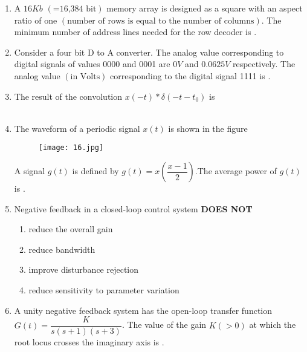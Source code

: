 \documentclass[12pt,-letter paper]{article}
\providecommand{\brak}[1]{\ensuremath{\left(#1\right)}}
\theoremstyle{remark}
\begin{document}
\begin{enumerate}
\item A $16Kb$ \brak{\text{=16,384 bit}} memory array is designed as a square with an aspect ratio of one \brak{\text{number of rows is equal to the number of columns}}. The minimum number of address lines needed for the row decoder is \underline{\hspace{1cm}}.
\item Consider a four bit D to A converter. The analog value corresponding to digital signals of values 0000 and 0001 are $0V$ and 0.$0625V$ respectively. The analog value \brak{\text{in Volts}} corresponding to the digital signal 1111 is \underline{\hspace{1cm}}.
\item The result of the convolution $x\brak{-t} * \delta \brak{-t-t_0}$ is\\
\\ 
\item The waveform of a periodic signal $x\brak{t}$ is shown in the figure
\begin{figure}[H]
        \centering
        \texttt{[image: 16.jpg]}
    \end{figure}
    A signal $g\brak{t}$ is defined by $g\brak{t}=x\brak{\dfrac{x-1}{2}}$.The average power of $g\brak{t}$ is \underline{\hspace{1cm}}.
    \item Negative feedback in a closed-loop control system \textbf{DOES NOT}\\
    \begin{enumerate}
        \item reduce the overall gain 
        \item reduce bandwidth
        \item improve disturbance rejection 
        \item reduce sensitivity to parameter variation
    \end{enumerate}
    \item A unity negative feedback system has the open-loop transfer function $G\brak{t}=\dfrac{K}{s\brak{s+1}\brak{s+3}}$. The value of the gain $K\brak{>0}$ at which the root locus crosses the imaginary axis is \underline{\hspace{1cm}}.

\end{enumerate}
\end{document}
